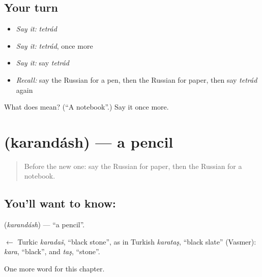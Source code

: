 \subsection*{Your turn}
\begin{itemize}
\raggedright
  \item \emph{Say it:} \emph{tetrád}
  \item \emph{Say it:} \emph{tetrád}, once more
  \item \emph{Say it:} say \emph{tetrád}
  \item \emph{Recall:} say the Russian for a pen, then the Russian for paper, then say \emph{tetrád} again
\end{itemize}

\begin{tcolorbox}[breakable,colback=teal!4,colframe=teal!35!black,title={Before you move on}]
What does  mean? (\textquotedblleft{}A notebook\textquotedblright{}.) Say it once more.
\end{tcolorbox}
\section[\texorpdfstring{\ru{карандаш} (karandásh)}{карандаш (karandásh)}]{ (karandásh) — a pencil}

\label{lesson:RU-C52-pencil}



\begin{quote}
Before the new one: say the Russian for paper, then the Russian for a notebook.
\end{quote}

\subsection*{You'll want to know: }
\textbf{} (\emph{karandásh}) — \textquotedblleft{}a pencil\textquotedblright{}.

\begin{cousinweb}
\textbf{} $\leftarrow$ Turkic \emph{karadaš}, \textquotedblleft{}black stone\textquotedblright{}, as in Turkish \emph{karataş}, \textquotedblleft{}black slate\textquotedblright{} (Vasmer): \emph{kara}, \textquotedblleft{}black\textquotedblright{}, and \emph{taş}, \textquotedblleft{}stone\textquotedblright{}.
\end{cousinweb}

\begin{grammarlens}[title={What you've built}]
One more word for this chapter.
\end{grammarlens}

